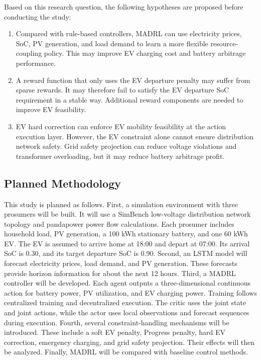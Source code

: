 \documentclass[12pt,a4paper]{ctexart}
\begin{document}
Based on this research question, the following hypotheses are proposed before conducting the study:
\begin{enumerate}
  \item Compared with rule-based controllers, MADRL can use electricity prices, SoC, PV generation, and load demand to learn a more flexible resource-coupling policy. This may improve EV charging cost and battery arbitrage performance.
  \item A reward function that only uses the EV departure penalty may suffer from sparse rewards. It may therefore fail to satisfy the EV departure SoC requirement in a stable way. Additional reward components are needed to improve EV feasibility.
  \item EV hard correction can enforce EV mobility feasibility at the action execution layer. However, the EV constraint alone cannot ensure distribution network safety. Grid safety projection can reduce voltage violations and transformer overloading, but it may reduce battery arbitrage profit.
\end{enumerate}

\subsection{Planned Methodology}

This study is planned as follows. First, a simulation environment with three prosumers will be built. It will use a SimBench low-voltage distribution network topology and pandapower power flow calculations. Each prosumer includes household load, PV generation, a 100 kWh stationary battery, and one 60 kWh EV. The EV is assumed to arrive home at 18:00 and depart at 07:00. Its arrival SoC is 0.30, and its target departure SoC is 0.90. Second, an LSTM model will forecast electricity prices, load demand, and PV generation. These forecasts provide horizon information for about the next 12 hours. Third, a MADRL controller will be developed. Each agent outputs a three-dimensional continuous action for battery power, PV utilization, and EV charging power. Training follows centralized training and decentralized execution. The critic uses the joint state and joint actions, while the actor uses local observations and forecast sequences during execution. Fourth, several constraint-handling mechanisms will be introduced. These include a soft EV penalty, Progress penalty, hard EV correction, emergency charging, and grid safety projection. Their effects will then be analyzed. Finally, MADRL will be compared with baseline control methods.
\end{document}
